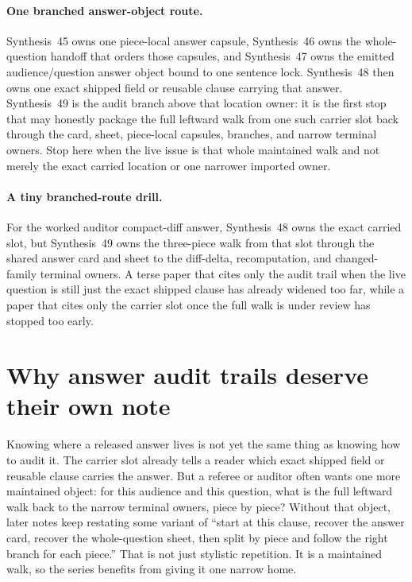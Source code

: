 \documentclass[11pt]{article}
\begin{document}
\paragraph{One branched answer-object route.}
Synthesis~45 owns one piece-local answer capsule, Synthesis~46 owns the whole-question handoff that orders those capsules, and Synthesis~47 owns the emitted audience/question answer object bound to one sentence lock. Synthesis~48 then owns one exact shipped field or reusable clause carrying that answer. Synthesis~49 is the audit branch above that location owner: it is the first stop that may honestly package the full leftward walk from one such carrier slot back through the card, sheet, piece-local capsules, branches, and narrow terminal owners. Stop here when the live issue is that whole maintained walk and not merely the exact carried location or one narrower imported owner.

\paragraph{A tiny branched-route drill.}
For the worked auditor compact-diff answer, Synthesis~48 owns the exact carried slot, but Synthesis~49 owns the three-piece walk from that slot through the shared answer card and sheet to the diff-delta, recomputation, and changed-family terminal owners. A terse paper that cites only the audit trail when the live question is still just the exact shipped clause has already widened too far, while a paper that cites only the carrier slot once the full walk is under review has stopped too early.

\section{Why answer audit trails deserve their own note}
Knowing where a released answer lives is not yet the same thing as knowing how to audit it.
The carrier slot already tells a reader which exact shipped field or reusable clause carries the answer.
But a referee or auditor often wants one more maintained object: for this audience and this question, what is the full leftward walk back to the narrow terminal owners, piece by piece?
Without that object, later notes keep restating some variant of ``start at this clause, recover the answer card, recover the whole-question sheet, then split by piece and follow the right branch for each piece.''
That is not just stylistic repetition.
It is a maintained walk, so the series benefits from giving it one narrow home.
\end{document}
